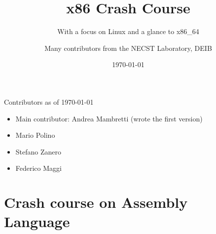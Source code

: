 \documentclass[]{beamer}
\title{x86 Crash Course}
\subtitle{With a focus on Linux and a glance to x86\_64}
\author[NECSTLab]{Many contributors from the NECST Laboratory, DEIB}
\institute{Politecnico di Milano}
\date{\today}
\begin{document}
\begin{frame}
  \titlepage
\end{frame}

\begin{frame}{Contributors as of \today}
  \begin{itemize}
  \item Main contributor: Andrea Mambretti (wrote the first version)
  \item Mario Polino
  \item Stefano Zanero
  \item Federico Maggi
  \end{itemize}
\end{frame}

\section[Outline]{}

\begin{frame}
  \tableofcontents
\end{frame}
\section {Crash course on Assembly Language}
\end{document}
